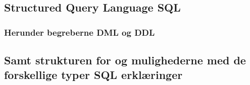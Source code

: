 \newpage

\subsection{Structured Query Language SQL}

\subsubsection{Herunder begreberne DML og DDL}

\subsection{Samt strukturen for og mulighederne med de forskellige typer SQL erklæringer}